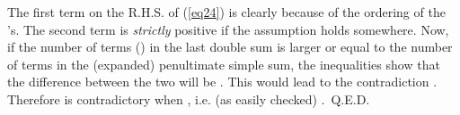 \documentclass[a4paper,12pt]{article}
\begin{document}
The first term on the R.H.S. of (\ref{eq24}) is clearly \coordHE{} 
because of the ordering of the \coordHE{}'s. The second term is {\it 
strictly} positive if the assumption \coordHE{} holds 
somewhere. Now, if the number of terms (\coordHE{}) in the 
last double sum is larger or equal to the number of terms \coordHE{} 
in the (expanded) penultimate simple sum, the inequalities \coordHE{} show that the difference between the two will 
be \coordHE{}. This would lead to the contradiction \coordHE{}. Therefore 
\coordHE{} is contradictory when \coordHE{}, 
i.e. (as easily checked) \coordHE{}.~Q.E.D.
\end{document}

